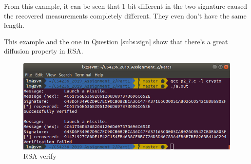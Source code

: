 From this example, it can be seen that 1 bit different in the two signature caused the recovered measurements completely different. They even don't have the same length.

This example and the one in Question \ref{subs:sign} show that there's a great diffusion property in RSA.

\begin{figure}[ht]
\centering
\includegraphics[width=\columnwidth]{resources/p2_7.png}
\caption{
    RSA verify
}
\label{fig:p2_7}
\end{figure}